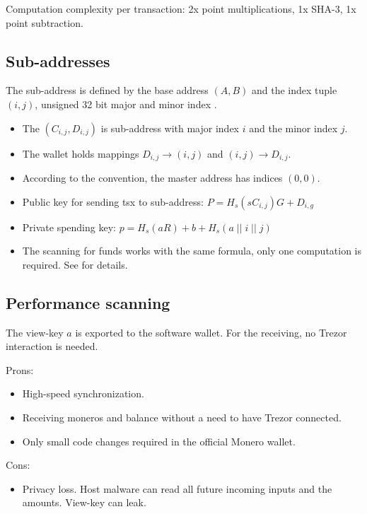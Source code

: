 \documentclass[]{article}
\begin{document}
Computation complexity per transaction: 2x point multiplications, 1x SHA-3, 1x point subtraction.

\subsection{Sub-addresses}
The sub-address is defined by the base address $(A,B)$ and the index tuple $(i,j)$, unsigned 32 bit major and minor index \cite{mrl_006_subaddr}.

\begin{itemize}
	\item The $(C_{i,j}, D_{i,j})$ is sub-address with major index $i$ and the minor index $j$.
	
	\item  The wallet holds mappings $D_{i,j} \rightarrow (i, j)$ and $(i, j) \rightarrow D_{i,j}$. 
	
	\item According to the convention, the master address has indices $(0, 0)$.
	
	\item Public key for sending tsx to sub-address: $P = H_s(sC_{i,j})G + D_{i,g}$
	
	\item Private spending key: $p = H_s(aR) + b + H_s(a \; || \; i \; || \; j)$
	
	\item The scanning for funds works with the same formula, only one computation is required. See \cite{mrl_006_subaddr} for details.
\end{itemize}

\subsection{Performance scanning} 
The view-key $a$ is exported to the software wallet. For the receiving, no Trezor interaction is needed. 

\noindent Prons:
\begin{itemize}
	\item High-speed synchronization.
	\item Receiving moneros and balance without a need to have Trezor connected.
	\item Only small code changes required in the official Monero wallet.
\end{itemize}

\noindent Cons:
\begin{itemize}
	\item Privacy loss. Host malware can read all future incoming inputs and the amounts. View-key can leak.
\end{itemize}
\end{document}
